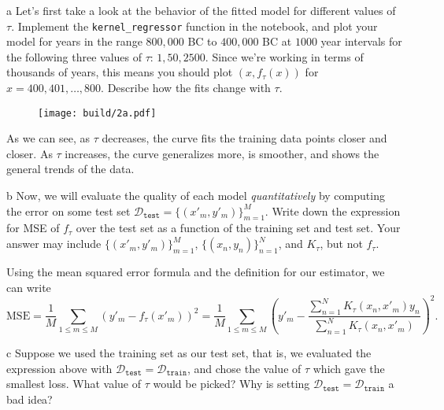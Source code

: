 \documentclass[expanded]{lkx_pset}
\begin{document}
\begin{parts}
  \begin{part}{a}
    Let's first take a look at the behavior of the fitted model for different values of $\tau$. Implement the \texttt{kernel\_regressor} function in the notebook, and plot your model for years in the range $800,000$ BC to $400,000$ BC at $1000$ year intervals for the following three values of $\tau$: $1, 50, 2500$. 
    Since we're working in terms of thousands of years, this means you should plot $(x, f_\tau(x))$ for $x = 400, 401, \dots, 800$. Describe how the fits change with $\tau$.
  \end{part}

  \begin{figure}[ht]
    \centering
    \texttt{[image: build/2a.pdf]}
  \end{figure}\noindent
  As we can see, as $\tau$ decreases, the curve fits the training data points closer and closer. As $\tau$ increases, the curve generalizes more, is smoother, and shows the general trends of the data.

  \begin{part}{b} 
    Now, we will evaluate the quality of each model \emph{quantitatively} by computing the error on some test set $\mathcal{D}_\texttt{test} = \{(x'_m, y'_m)\}_{m = 1} ^M$.  Write down the expression for MSE of $f_\tau$ over the test set as a function of the training set and test set. Your answer may include $\{(x'_m, y'_m)\}_{m = 1} ^M$, $\{(x_n, y_n)\}_{n = 1} ^N$, and $K_\tau$, but not $f_\tau$.
  \end{part}

  Using the mean squared error formula and the definition for our estimator, we can write
  \[
    \mathrm{MSE} = \frac{1}{M} \sum_{1\leq m \leq M} \left(y'_m - f_\tau(x'_m)\right)^2 
    = \frac{1}{M}\sum_{1\leq m \leq M} \left(y'_m - \frac{\sum_{n=1}^N K_\tau(x_n, x'_m)y_n}{\sum_{n=1}^N K_\tau(x_n, x'_m)}\right)^2.
  \]

  \begin{part}{c}
    Suppose we used the training set as our test set, that is, we evaluated the expression above with $\mathcal{D}_\texttt{test} = \mathcal{D}_\texttt{train}$, and chose the value of $\tau$ which gave the smallest loss.  What value of $\tau$ would be picked?  Why is setting $\mathcal{D}_\texttt{test} = \mathcal{D}_\texttt{train}$ a bad idea?
  \end{part}


\end{parts}
\end{document}
